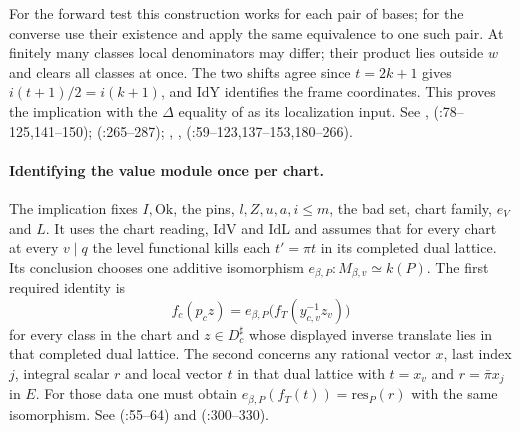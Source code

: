 For the forward test this construction works for each pair of bases;
for the converse use their existence and apply the same equivalence
to one such pair. At finitely many classes local denominators may
differ; their product lies outside $w$ and clears all classes at once.
The two shifts agree since $t=2k+1$ gives $i(t+1)/2=i(k+1)$,
and $\mathrm{IdY}$ identifies the frame coordinates. This proves the
implication  with the $\Delta$ equality of
 as its localization input. See ,
(:78--125,141--150);
 (:265--287);
, ,
 (:59--123,137--153,180--266).

\paragraph{Identifying the value module once per chart.}\label{r13:fv-field}
The implication  fixes $I,\mathrm{Ok}$, the pins,
$l,Z,u,a,i\le m$, the bad set, chart family, $e_V$ and $L$. It uses
the chart reading, $\mathrm{IdV}$ and $\mathrm{IdL}$ and assumes that
for every chart at every $v\mid q$ the level functional kills each
$t'=\pi t$ in its completed dual lattice. Its conclusion chooses
one additive isomorphism $e_{\beta,P}:M_{\beta,v}\simeq k(P)$.
The first required identity is
\[
 f_c(p_c z)=e_{\beta,P}\bigl(f_T(y_{c,v}^{-1}z_v)\bigr)
\]
for every class in the chart and $z\in D_c^\sharp$ whose displayed
inverse translate lies in that completed dual lattice.
The second concerns any rational vector $x$, last index $j$,
integral scalar $r$ and local vector $t$ in that dual lattice with
$t=x_v$ and $r=\bar\pi x_j$ in $E$. For those data one must obtain
$e_{\beta,P}(f_T(t))=\mathrm{res}_P(r)$ with the same isomorphism.
See 
(:55--64)
and  (:300--330).

